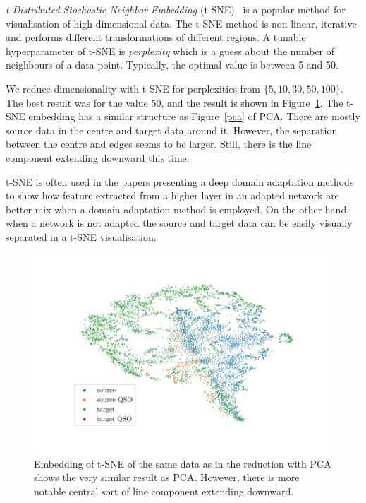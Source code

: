 \textit{t-Distributed Stochastic Neighbor Embedding} (t-SNE)~\cite{maaten2008, wattenberg2016} is a popular method for visualisation of high-dimensional data.
The t-SNE method is non-linear, iterative
and performs different transformations of different regions.
A tunable hyperparameter of t-SNE is \textit{perplexity}
which is a guess about the number of neighbours of a data point.
Typically, the optimal value is between 5 and 50.

We reduce dimensionality with t-SNE for perplexities from \(\{5, 10, 30, 50, 100\}\).
The best result was for the value 50,
and the result is shown in Figure~\ref{tsne}.
The t-SNE embedding has a similar structure as Figure~\ref{pca} of PCA.
There are mostly source data in the centre and target data around it.
However, the separation between the centre and edges seems to be larger.
Still, there is the line component extending downward this time.

t-SNE is often used in the papers presenting a deep domain adaptation methods
to show how feature extracted from a higher layer in an adapted network
are better mix when a domain adaptation method is employed.
On the other hand, when a network is not adapted the source and target data
can be easily visually separated in a t-SNE visualisation.

\begin{figure}
\includegraphics[width=\textwidth]{img/tsne.pdf}
\caption[t-SNE visualisation of source and target data distributions]{
	Embedding of t-SNE of the same data
	as in the reduction with PCA shows the very similar result as PCA.
	However, there is more notable central sort of line component
	extending downward.
	}
\label{tsne}
\end{figure}

